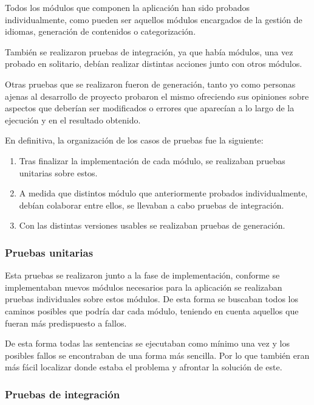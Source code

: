 \documentclass[a4paper,12pt]{article}
\begin{document}
Todos los módulos que componen la aplicación han sido probados individualmente, como pueden
ser aquellos módulos encargados de la gestión de idiomas, generación de contenidos o categorización.

También se realizaron pruebas de integración, ya que había módulos, una vez probado en solitario,
debían realizar distintas acciones junto con otros módulos.

Otras pruebas que se realizaron fueron de generación, tanto yo como
personas ajenas al desarrollo de proyecto probaron el
mismo ofreciendo sus opiniones sobre aspectos que deberían ser modificados o
errores que aparecían a lo largo de la ejecución y en el resultado obtenido.

En definitiva, la organización de los casos de pruebas fue la siguiente:

\begin{enumerate}
    \item Tras finalizar la implementación de cada módulo, se realizaban pruebas unitarias sobre estos.
    \item A medida que distintos módulo que anteriormente probados individualmente, debían colaborar entre ellos, se
    llevaban a cabo pruebas de integración.
    \item Con las distintas versiones usables se realizaban pruebas de generación.
\end{enumerate}

\subsubsection{Pruebas unitarias}

Esta pruebas se realizaron junto a la fase de implementación, conforme se implementaban nuevos módulos necesarios para la aplicación
se realizaban pruebas individuales sobre estos módulos. De esta forma se buscaban todos los caminos posibles que podría dar cada
módulo, teniendo en cuenta aquellos que fueran más predispuesto a fallos.

De esta forma todas las sentencias se ejecutaban como mínimo una vez y los posibles fallos se encontraban de una forma más sencilla.
Por lo que también eran más fácil localizar donde estaba el problema y afrontar la solución de este.

\subsubsection{Pruebas de integración}
\end{document}
